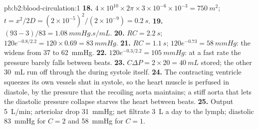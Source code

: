 \begin{solution}{pb:b2:blood-circulation:1}
\textbf{18.} $4\times 10^{10}\times 2\pi\times 3\times 10^{-6}\times
10^{-3} = \qty{750}{m^2}$; $t = x^{2}/2D = (2\times 10^{-5})^{2}/
(2\times 10^{-9}) = \qty{0.2}{s}$.
\textbf{19.} $(93 - 3)/83 = \qty{1.08}{mmHg.s/mL}$.
\textbf{20.} $RC = \qty{2.2}{s}$; $120e^{-0.8/2.2} = 120\times 0.69 =
\qty{83}{mmHg}$.
\textbf{21.} $RC = \qty{1.1}{s}$; $120e^{-0.73} = \qty{58}{mmHg}$: the
 widens from 37 to \qty{62}{mmHg}.
\textbf{22.} $120e^{-0.3/2.2} = \qty{105}{mmHg}$: at a fast rate the
pressure barely falls between beats.
\textbf{23.} $C\Delta P = 2\times 20 = \qty{40}{mL}$ stored; the other
\qty{30}{mL} run off through the  during systole itself.
\textbf{24.} The contracting ventricle squeezes its own vessels shut
in systole, so the heart muscle is perfused in diastole, by the
pressure that the recoiling aorta maintains; a stiff aorta that lets
the diastolic pressure collapse starves the heart between beats.
\textbf{25.} Output \qty{5}{L/min}; arteriolar drop \qty{31}{mmHg};
net filtrate \qty{3}{L} a day to the lymph; diastolic \qty{83}{mmHg}
for $C = 2$ and \qty{58}{mmHg} for $C = 1$.
\end{solution}
